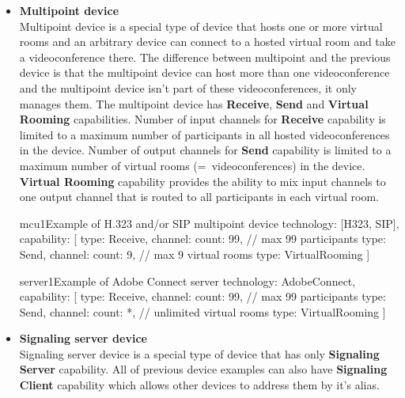 \documentclass[a4paper]{report}
\begin{document}
\begin{itemize}
\begin{TopologyExample}{terminal4}{Example of terminal with one virtual room for H.323 and/or SIP}
technology: [H323, SIP],
capability: [
  {type: Receive, channel: {count: 9}}, // max 9 other participants
  {type: Send, channel: {count: 1}},
  {type: Mix}
]
\end{TopologyExample}

\item \textbf{Multipoint device} \\
  Multipoint device is a special type of device that hosts one or more virtual 
  rooms and an arbitrary device can connect to a hosted virtual room and take 
  a videoconference there. The difference between multipoint and the previous 
  device is that the multipoint device can host more than one videoconference 
  and the multipoint device isn't part of these videoconferences, it only 
  manages them. The multipoint device has \textbf{Receive}, \textbf{Send}
  and \textbf{Virtual Rooming} capabilities. Number of input 
  channels for \textbf{Receive} capability is limited to a maximum number of 
  participants in all hosted videoconferences in the device. Number of output 
  channels for \textbf{Send} capability is limited to a maximum number of 
  virtual rooms (=~videoconferences) in the device. \textbf{Virtual Rooming} 
  capability provides the ability to mix input channels to one output channel 
  that is routed to all participants in each virtual room.

\begin{TopologyExample}{mcu1}{Example of H.323 and/or SIP multipoint device}
technology: [H323, SIP],
capability: [
  {type: Receive, channel: {count: 99}}, // max 99 participants
  {type: Send, channel: {count: 9}},     // max 9 virtual rooms
  {type: VirtualRooming}
]
\end{TopologyExample}

\begin{TopologyExample}{server1}{Example of Adobe Connect server}
technology: AdobeConnect,
capability: [
  {type: Receive, channel: {count: 99}}, // max 99 participants
  {type: Send, channel: {count: *}},     // unlimited virtual rooms
  {type: VirtualRooming}
]
\end{TopologyExample}

\item \textbf{Signaling server device} \\
  Signaling server device is a special type of device that has only 
  \textbf{Signaling Server} capability. All of previous device examples can 
  also have \textbf{Signaling Client} capability which allows other devices
  to address them by it's alias.
    

\end{itemize}
\end{document}
